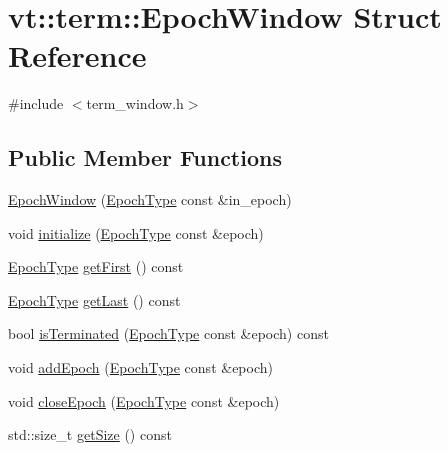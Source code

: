\hypertarget{structvt_1_1term_1_1_epoch_window}{}\section{vt\+:\+:term\+:\+:Epoch\+Window Struct Reference}
\label{structvt_1_1term_1_1_epoch_window}


{\ttfamily \#include $<$term\+\_\+window.\+h$>$}

\subsection*{Public Member Functions}
\begin{DoxyCompactItemize}
\item 
\hyperlink{structvt_1_1term_1_1_epoch_window_a48e5c7c25ba6572ef86f82ee7c7af2ed}{Epoch\+Window} (\hyperlink{namespacevt_a985a5adf291c34a3ca263b3378388236}{Epoch\+Type} const \&in\+\_\+epoch)
\item 
void \hyperlink{structvt_1_1term_1_1_epoch_window_a2c55839ab883365d71d1de785744df9e}{initialize} (\hyperlink{namespacevt_a985a5adf291c34a3ca263b3378388236}{Epoch\+Type} const \&epoch)
\item 
\hyperlink{namespacevt_a985a5adf291c34a3ca263b3378388236}{Epoch\+Type} \hyperlink{structvt_1_1term_1_1_epoch_window_a2775ad5ee039b9c319403ec4184cdd1c}{get\+First} () const
\item 
\hyperlink{namespacevt_a985a5adf291c34a3ca263b3378388236}{Epoch\+Type} \hyperlink{structvt_1_1term_1_1_epoch_window_a3e3f2c54fef79025183e4edb61f404dd}{get\+Last} () const
\item 
bool \hyperlink{structvt_1_1term_1_1_epoch_window_a9617344ff1e04ab54dd4a414ac42c349}{is\+Terminated} (\hyperlink{namespacevt_a985a5adf291c34a3ca263b3378388236}{Epoch\+Type} const \&epoch) const
\item 
void \hyperlink{structvt_1_1term_1_1_epoch_window_a38502baeeae067a563d611e0e31e5e44}{add\+Epoch} (\hyperlink{namespacevt_a985a5adf291c34a3ca263b3378388236}{Epoch\+Type} const \&epoch)
\item 
void \hyperlink{structvt_1_1term_1_1_epoch_window_ac4f58e068b8458f8fd8520474ab8e4c7}{close\+Epoch} (\hyperlink{namespacevt_a985a5adf291c34a3ca263b3378388236}{Epoch\+Type} const \&epoch)
\item 
std\+::size\+\_\+t \hyperlink{structvt_1_1term_1_1_epoch_window_ac33e7c5184370881532550540f2aa7b3}{get\+Size} () const
\end{DoxyCompactItemize}


